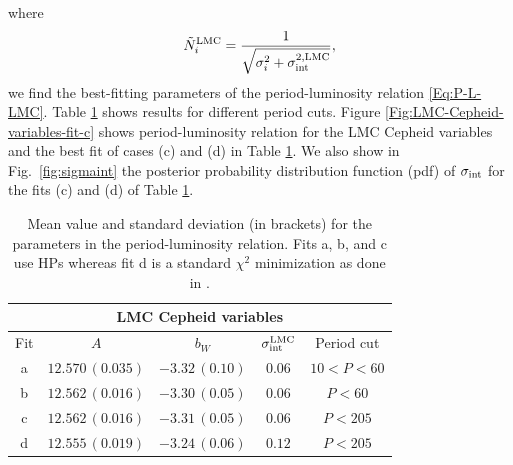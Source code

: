 where 
\begin{equation}
\label{Eq:normalization-LMC}
\tilde{N}^{\mathrm{LMC}}_i = \frac{1}{\sqrt{\sigma_i^2 +\sigma^{2,\mathrm{LMC}}_{\mathrm{int}}}},
\end{equation}
we find the best-fitting parameters of the period-luminosity relation \eqref{Eq:P-L-LMC}. Table \ref{Table:LMC-fits} shows results for different period cuts. Figure \ref{Fig:LMC-Cepheid-variables-fit-c} shows period-luminosity relation for the LMC Cepheid variables and the best fit of cases (c) and (d) in Table \ref{Table:LMC-fits}. We also show in Fig.\ \ref{fig:sigmaint} the posterior probability distribution function (pdf) of $\sigma_{\mathrm{int}}$ for the fits (c) and (d) of Table \ref{Table:LMC-fits}.

\begin{table}[tbp]
\centering
\begin{tabular}{@{}ccccc}
\hline
\multicolumn{5}{c}{LMC Cepheid variables} \\
\hline
Fit & $A$ & $b_W$ & $\sigma_{\mathrm{int}}^{\mathrm{LMC}}$ & Period cut \\
\hline
 a & $12.570\,(0.035)$ & $-3.32\,(0.10)$ & $0.06$ & $10<P<60$ \\
  
 b & $12.562\,(0.016)$&$-3.30\,(0.05)$ & $0.06$ & $P<60$ \\

 c & $12.562\,(0.016)$& $-3.31\,(0.05)$& $0.06$ & $P<205$ \\

 d & $12.555\,(0.019)$& $-3.24\,(0.06)$& $0.12$ & $P<205$ \\
\hline
\end{tabular}
\caption{\label{Table:LMC-fits} Mean value and standard deviation (in brackets) for the parameters in the period-luminosity relation. Fits a, b, and c use HPs whereas fit d is a standard $\chi^2$ minimization as done in \cite{Efstathiou:2013via}.}
\end{table}


